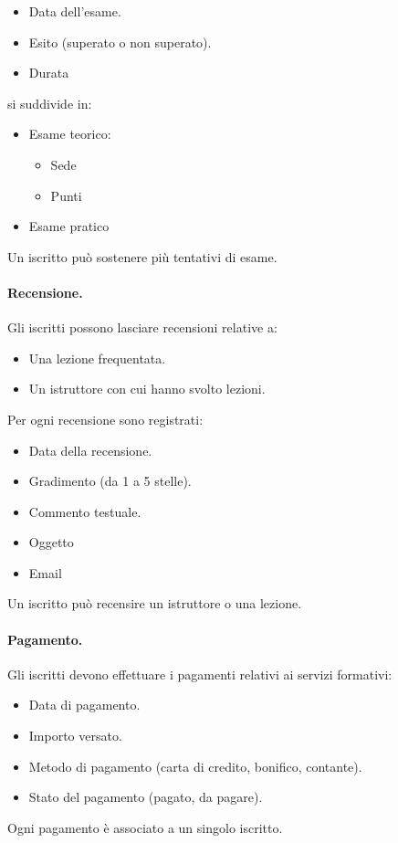 \documentclass[10pt,twoside]{article}
\begin{document}
{    \begin{itemize}
            \item Data dell’esame.
            \item Esito (superato o non superato).
            \item Durata
    \end{itemize}

    si suddivide in: 

    \begin{itemize}
        \item Esame teorico:
        \begin{itemize}
            \item Sede
            \item Punti
        \end{itemize}
        \item Esame pratico
    \end{itemize}

    Un iscritto può sostenere più tentativi di esame. 


    \paragraph{Recensione.}
    Gli iscritti possono lasciare recensioni relative a:

    \begin{itemize}
        \item Una lezione frequentata.
        \item Un istruttore con cui hanno svolto lezioni.
    \end{itemize}

    Per ogni recensione sono registrati:

    \begin{itemize}
        \item Data della recensione.
        \item Gradimento (da 1 a 5 stelle).
        \item Commento testuale.
        \item Oggetto 
        \item Email
    \end{itemize}

    Un iscritto può recensire un istruttore o una lezione.


    \paragraph{Pagamento.}
    Gli iscritti devono effettuare i pagamenti relativi ai servizi formativi:

    \begin{itemize}
        \item Data di pagamento.
        \item Importo versato.
        \item Metodo di pagamento (carta di credito, bonifico, contante).
        \item Stato del pagamento (pagato, da pagare).
    \end{itemize}

    Ogni pagamento è associato a un singolo iscritto.

}
\end{document}
